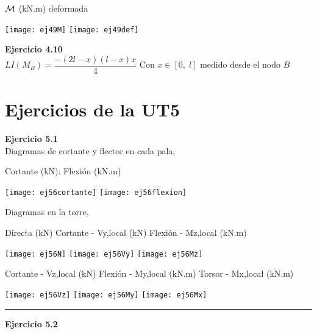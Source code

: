 ${\mathcal M}$ (kN.m) \hspace{0.4\textwidth} deformada
\begin{center}
	\texttt{[image: ej49M]}
	\texttt{[image: ej49def]}
\end{center}

\textbf{Ejercicio 4.10}\\

$LI(M_B)=\dfrac{-(2l-x)(l-x)x}{4}$
Con $x\in[0,\;l]$ medido desde el nodo $B$






\section{Ejercicios de la UT5}




\textbf{Ejercicio 5.1}\\

Diagramas de cortante y flector en cada pala,

Cortante (kN):  \qquad 
Flexión (kN.m)

\texttt{[image: ej56cortante]}
\texttt{[image: ej56flexion]}


Diagramas en la torre,

\noindent
Directa (kN)
\quad
Cortante - Vy,local (kN)
\quad
Flexión - Mz,local (kN.m)

\texttt{[image: ej56N]}
\texttt{[image: ej56Vy]}
\texttt{[image: ej56Mz]}


\noindent
Cortante - Vz,local (kN)
\quad
Flexión - My,local (kN.m)
\quad
Torsor - Mx,local (kN.m)

\texttt{[image: ej56Vz]}
\texttt{[image: ej56My]}
\texttt{[image: ej56Mx]}





\hrule
\vspace{5mm}
\textbf{Ejercicio 5.2}\\

\begin{center}
	\def\svgwidth{0.8\textwidth}
	
\end{center}







